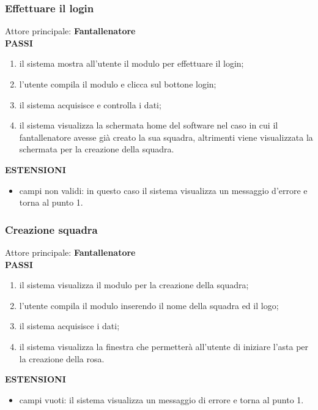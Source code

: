 \documentclass[12pt,a4paper]{article}
\begin{document}
\subsubsection{Effettuare il login}
Attore principale: \textbf{Fantallenatore}\\
\newline
\textbf{PASSI}
\begin{enumerate}
\item il sistema mostra all'utente il modulo per effettuare il login;
\item l'utente compila il modulo e clicca sul bottone login;
\item il sistema acquisisce e controlla i dati;
\item il sistema visualizza la schermata home del software nel caso in cui il fantallenatore avesse già creato la sua squadra, altrimenti viene visualizzata la schermata per la creazione della squadra.
\end{enumerate}
\textbf{ESTENSIONI}
\begin{itemize}
\item campi non validi: in questo caso il sistema visualizza un messaggio d'errore e torna al punto 1.
\end{itemize}
\subsubsection{Creazione squadra}
Attore principale: \textbf{Fantallenatore}\\
\newline
\textbf{PASSI}
\begin{enumerate}
\item il sistema visualizza il modulo per la creazione della squadra;
\item l'utente compila il modulo inserendo il nome della squadra ed il logo;
\item il sistema acquisisce i dati;
\item il sistema visualizza la finestra che permetterà all'utente di iniziare l'asta per la creazione della rosa.
\end{enumerate}
\textbf{ESTENSIONI}
\begin{itemize}
\item campi vuoti: il sistema visualizza un messaggio di errore e torna al punto 1.
\end{itemize}
\end{document}
